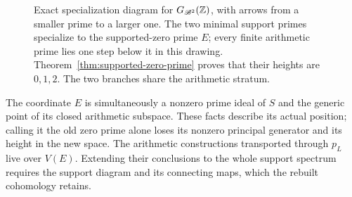 \begin{figure}[ht]
\centering
{}
\caption{Exact specialization diagram for $G_{\mathscr B^2}(\mathbb Z)$, with arrows from a smaller prime to a larger one. The two minimal support primes specialize to the supported-zero prime $E$; every finite arithmetic prime lies one step below it in this drawing. Theorem~\ref{thm:supported-zero-prime} proves that their heights are $0,1,2$. The two branches share the arithmetic stratum.}
\label{fig:e-prime}
\end{figure}

The coordinate $E$ is simultaneously a nonzero prime ideal of $S$ and the generic point of its closed arithmetic subspace. These facts describe its actual position; calling it the old zero prime alone loses its nonzero principal generator and its height in the new space. The arithmetic constructions transported through $p_L$ live over $V(E)$. Extending their conclusions to the whole support spectrum requires the support diagram and its connecting maps, which the rebuilt cohomology retains.
